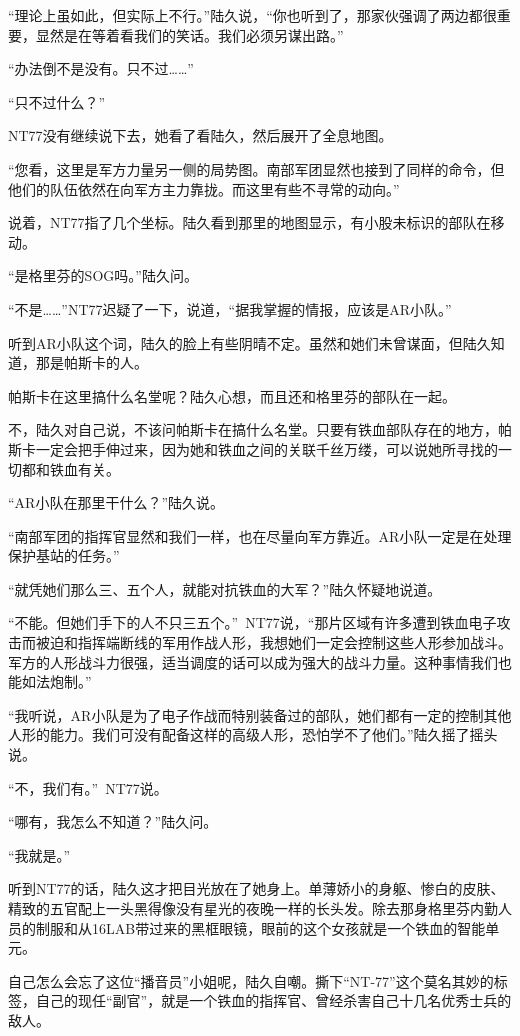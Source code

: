 “理论上虽如此，但实际上不行。”陆久说，“你也听到了，那家伙强调了两边都很重要，显然是在等着看我们的笑话。我们必须另谋出路。”

“办法倒不是没有。只不过……”

“只不过什么？”

NT77没有继续说下去，她看了看陆久，然后展开了全息地图。

“您看，这里是军方力量另一侧的局势图。南部军团显然也接到了同样的命令，但他们的队伍依然在向军方主力靠拢。而这里有些不寻常的动向。”

说着，NT77指了几个坐标。陆久看到那里的地图显示，有小股未标识的部队在移动。

“是格里芬的SOG吗。”陆久问。

“不是……”NT77迟疑了一下，说道，“据我掌握的情报，应该是AR小队。”

听到AR小队这个词，陆久的脸上有些阴晴不定。虽然和她们未曾谋面，但陆久知道，那是帕斯卡的人。

帕斯卡在这里搞什么名堂呢？陆久心想，而且还和格里芬的部队在一起。

不，陆久对自己说，不该问帕斯卡在搞什么名堂。只要有铁血部队存在的地方，帕斯卡一定会把手伸过来，因为她和铁血之间的关联千丝万缕，可以说她所寻找的一切都和铁血有关。

“AR小队在那里干什么？”陆久说。

“南部军团的指挥官显然和我们一样，也在尽量向军方靠近。AR小队一定是在处理保护基站的任务。”

“就凭她们那么三、五个人，就能对抗铁血的大军？”陆久怀疑地说道。

“不能。但她们手下的人不只三五个。” NT77说，“那片区域有许多遭到铁血电子攻击而被迫和指挥端断线的军用作战人形，我想她们一定会控制这些人形参加战斗。军方的人形战斗力很强，适当调度的话可以成为强大的战斗力量。这种事情我们也能如法炮制。”

“我听说，AR小队是为了电子作战而特别装备过的部队，她们都有一定的控制其他人形的能力。我们可没有配备这样的高级人形，恐怕学不了他们。”陆久摇了摇头说。

“不，我们有。” NT77说。

“哪有，我怎么不知道？”陆久问。

“我就是。”

听到NT77的话，陆久这才把目光放在了她身上。单薄娇小的身躯、惨白的皮肤、精致的五官配上一头黑得像没有星光的夜晚一样的长头发。除去那身格里芬内勤人员的制服和从16LAB带过来的黑框眼镜，眼前的这个女孩就是一个铁血的智能单元。

自己怎么会忘了这位“播音员”小姐呢，陆久自嘲。撕下“NT-77”这个莫名其妙的标签，自己的现任“副官”，就是一个铁血的指挥官、曾经杀害自己十几名优秀士兵的敌人。

